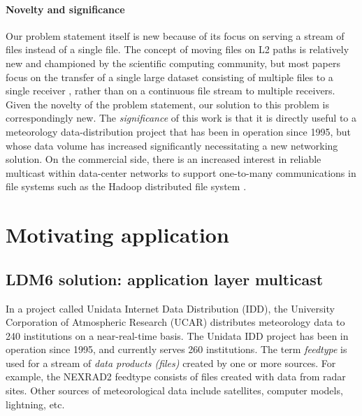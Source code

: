 
\paragraph{Novelty and significance} Our problem statement itself is new because
of its focus on serving a stream of files instead of a single file.
The concept of moving files
on L2 paths is relatively new and championed by the scientific computing community, but most papers focus on the transfer of a single large dataset consisting of multiple files to a single receiver
\cite{Kissel:2013:EWA:2534695.2534699},
rather than on a continuous file stream to multiple receivers.
Given the novelty of the problem statement, our solution to this problem is correspondingly new. The \emph{significance}
of this work is that it is directly useful to a meteorology data-distribution project \cite{IDD} that has been in operation since 1995, but whose data volume has increased significantly necessitating a new networking solution. On the commercial side, there is an increased interest in reliable multicast within data-center networks to support one-to-many communications in file systems such as the Hadoop distributed file system \cite{6504457}.

\section{Motivating application}
\subsection{LDM6 solution: application layer multicast}
\label{sec:LDM6}

In a project called Unidata Internet Data Distribution (IDD),
the University Corporation of Atmospheric Research (UCAR)
distributes meteorology data to 240 institutions on a near-real-time basis\cite{IDD}.
The Unidata IDD project has been in operation since 1995, and currently serves 260 institutions.
The term \emph{feedtype} is used for
a stream of \emph{data products (files)} created by one or more
sources. For example, the NEXRAD2 feedtype consists of files created with
data from radar sites. Other sources of meteorological data include
satellites, computer models, lightning, etc.

